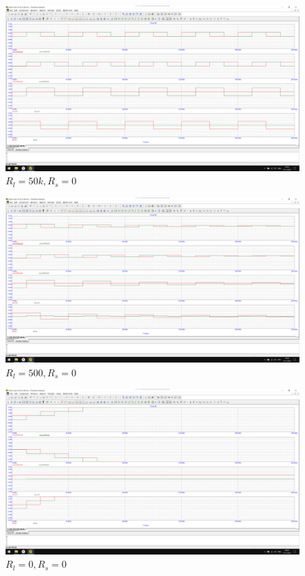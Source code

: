\documentclass[a4paper, 12pt]{article}
\begin{document}
    \begin{figure}[H]
    \centering
    \includegraphics[width = 14 cm]{images/Graph11.png}
    \caption{$R_l = 50k, R_s = 0$}
    \end{figure}
    
    \begin{figure}[H]
    \centering
    \includegraphics[width = 14 cm]{images/Graph12.png}
    \caption{$R_l = 500, R_s = 0$}
    \end{figure}
    
    \begin{figure}[H]
    \centering
    \includegraphics[width = 14 cm]{images/Graph13.png}
    \caption{$R_l = 0, R_s = 0$}
    \end{figure}
    
\end{document}
